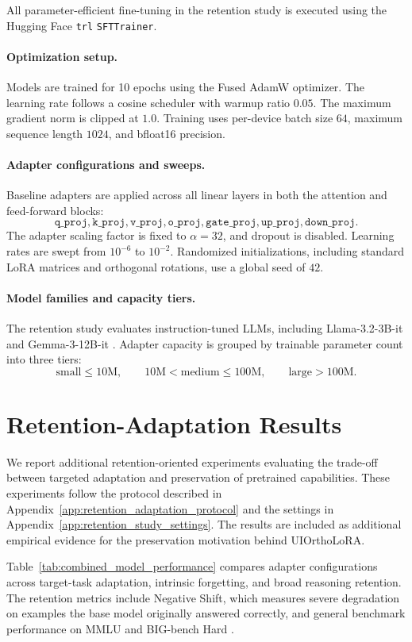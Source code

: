 All parameter-efficient fine-tuning in the retention study is executed using
the Hugging Face \texttt{trl} \texttt{SFTTrainer}.

\paragraph{Optimization setup.}
Models are trained for 10 epochs using the Fused AdamW optimizer. The learning
rate follows a cosine scheduler with warmup ratio \(0.05\). The maximum
gradient norm is clipped at \(1.0\). Training uses per-device batch size \(64\),
maximum sequence length \(1024\), and bfloat16 precision.

\paragraph{Adapter configurations and sweeps.}
Baseline adapters are applied across all linear layers in both the attention
and feed-forward blocks:
\[
\texttt{q\_proj},
\texttt{k\_proj},
\texttt{v\_proj},
\texttt{o\_proj},
\texttt{gate\_proj},
\texttt{up\_proj},
\texttt{down\_proj}.
\]
The adapter scaling factor is fixed to \(\alpha = 32\), and dropout is
disabled. Learning rates are swept from \(10^{-6}\) to \(10^{-2}\). Randomized
initializations, including standard LoRA matrices and orthogonal rotations,
use a global seed of \(42\).

\paragraph{Model families and capacity tiers.}
The retention study evaluates instruction-tuned LLMs, including
Llama-3.2-3B-it \citep{llama3_2024} and Gemma-3-12B-it \citep{gemma3_2025}. Adapter capacity is grouped by trainable
parameter count into three tiers:
\[
\text{small} \leq 10\text{M},
\qquad
10\text{M} < \text{medium} \leq 100\text{M},
\qquad
\text{large} > 100\text{M}.
\]

\section{Retention-Adaptation Results}
\label{app:retention_adaptation_results}

We report additional retention-oriented experiments evaluating the trade-off
between targeted adaptation and preservation of pretrained capabilities. These
experiments follow the protocol described in
Appendix~\ref{app:retention_adaptation_protocol} and the settings in
Appendix~\ref{app:retention_study_settings}. The results are included as
additional empirical evidence for the preservation motivation behind
UIOrthoLoRA.

Table~\ref{tab:combined_model_performance} compares adapter configurations across
target-task adaptation, intrinsic forgetting, and broad reasoning retention.
The retention metrics include Negative Shift, which measures severe degradation
on examples the base model originally answered correctly, and general benchmark
performance on MMLU \citep{hendrycks2020measuring} and BIG-bench Hard \citep{srivastava2023beyond}.



